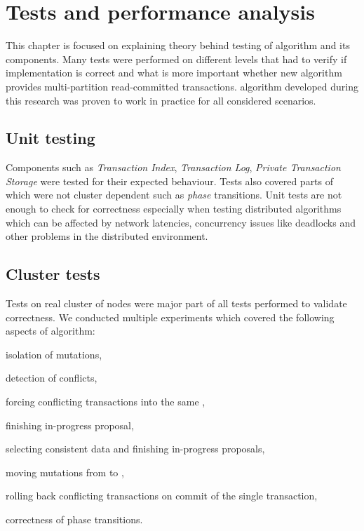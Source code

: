 
\chapter{Tests and performance analysis}\label{chapter:testing}

This chapter is focused on explaining theory behind testing of \mpt algorithm and its components. Many tests were performed on different levels that had to verify if implementation is correct and what is more important whether new \mpt algorithm provides multi-partition read-committed transactions. 
\mpt algorithm developed during this research was proven to work in practice for all considered scenarios. 

\section{Unit testing}
Components such as \emph{Transaction Index}, \emph{Transaction Log}, \emph{Private Transaction Storage} were  tested for their expected behaviour. Tests also covered parts of \mpt which were not cluster dependent such as \emph{phase} transitions. Unit tests are not enough to check for correctness especially when testing distributed algorithms which can be affected by network latencies, concurrency issues like deadlocks and other problems in the distributed environment. 

\section{Cluster tests}
Tests on real cluster of nodes were major part of all tests performed to validate \mpt correctness. We conducted multiple experiments which covered the following aspects of \mpt algorithm:
\begin{enumerate*}[label=\alph*)]
\item isolation of mutations,
\item detection of conflicts,
\item forcing conflicting transactions into the same \paxosRoundId,
\item finishing in-progress proposal,
\item selecting consistent data and finishing in-progress proposals,
\item moving mutations from \txStorage to \database,
\item rolling back conflicting transactions on commit of the single transaction,
\item correctness of phase transitions.
\end{enumerate*}

